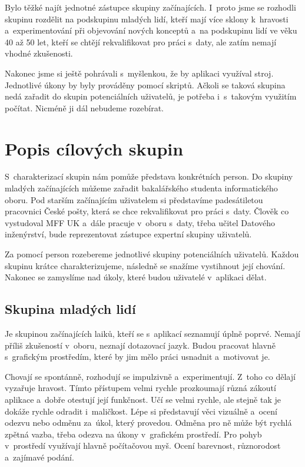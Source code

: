 Bylo těžké najít jednotné zástupce skupiny začínajících. I~proto jsme se rozhodli skupinu rozdělit na podskupinu mladých lidí, kteří mají více sklony k~hravosti a~experimentování při objevování nových konceptů a~na podskupinu lidí ve věku 40 až 50 let, kteří se chtějí rekvalifikovat pro práci s~daty, ale zatím nemají vhodné zkušenosti.

Nakonec jsme si ještě pohrávali s~myšlenkou, že by aplikaci využíval stroj. Jednotlivé úkony by byly prováděny pomocí skriptů. Ačkoli se taková skupina nedá zařadit do skupin potenciálních uživatelů, je potřeba i~s~takovým využitím počítat. Nicméně ji dál nebudeme rozebírat.

\section{Popis cílových skupin}\label{sec:popis-cilovych-skupin}

S~charakterizací skupin nám pomůže představa konkrétních person. Do skupiny mladých začínajících můžeme zařadit bakalářského studenta informatického oboru. Pod starším začínajícím uživatelem si představíme padesátiletou pracovnici České pošty, která se chce rekvalifikovat pro práci s~daty. Člověk co vystudoval MFF UK a~dále pracuje v~oboru s~daty, třeba učitel Datového inženýrství, bude reprezentovat zástupce expertní skupiny uživatelů. 

Za pomocí person rozebereme jednotlivé skupiny potenciálních uživatelů. Každou skupinu krátce charakterizujeme, následně se snažíme vystihnout její chování. Nakonec se zamyslíme nad úkoly, které budou uživatelé v~aplikaci dělat.

\subsection{Skupina mladých lidí}

Je skupinou začínajících laiků, kteří se s~aplikací seznamují úplně poprvé. Nemají příliš zkušeností v~oboru, neznají dotazovací jazyk. Budou pracovat hlavně s~grafickým prostředím, které by jim mělo práci usnadnit a~motivovat je.

Chovají se spontánně, rozhodují se impulzivně a~experimentují. Z~toho co dělají vyzařuje hravost. Tímto přístupem velmi rychle prozkoumají různá zákoutí aplikace a~dobře otestují její funkčnost. Učí se velmi rychle, ale stejně tak je dokáže rychle odradit i~maličkost. Lépe si představují věci vizuálně a~ocení odezvu nebo odměnu za~úkol, který provedou. Odměna pro ně může být rychlá zpětná vazba, třeba odezva na úkony v~grafickém prostředí. Pro pohyb v~prostředí využívají hlavně počítačovou myš. Ocení barevnost, různorodost a~zajímavé podání.


